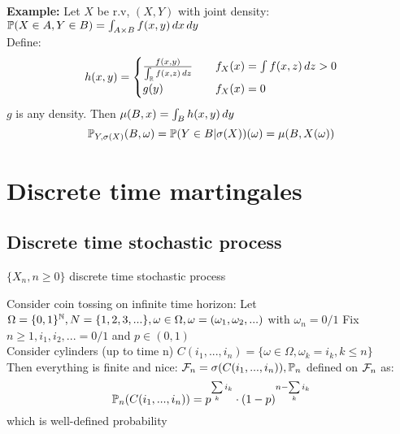 \textbf{Example:} Let $X$ be r.v, $(X,Y)$ with joint density: $\mathbb{P}(X\in A, Y\in B) =\int_{A\times B} f(x,y) \mathop{}\!d x\mathop{}\!d y$ \\Define:
\begin{equation*}
    h(x,y) = \begin{cases}
    \frac{f(x,y)}{\int_{\mathbb{R}} f(x,z) \mathop{}\!d z} \quad &f_X(x) = \int f(x,z)\mathop{}\!d z >0 \\
    g(y) \quad &f_X(x) = 0
    \end{cases}
\end{equation*}
$g$ is any density. Then $\mu(B,x)= \int_B h(x,y) \mathop{}\!d y$ 
\begin{equation*}
    \mathbb{P}_{Y,\sigma(X)} (B,\omega) = \mathbb{P}(Y\in B|\sigma(X))(\omega) = \mu(B, X(\omega))
\end{equation*}




\newpage
\section{Discrete time martingales}
\subsection*{Discrete time stochastic process}

$\{X_n, n\geq 0\}$ discrete time stochastic process
\begin{example}
Consider coin tossing on infinite time horizon: Let $\Omega = \{0,1\}^{\mathbb{N}}, N = \{1,2,3,...\}, \omega\in\Omega, \omega = (\omega_1, \omega_2, ...)$ with $\omega_n = 0/1$
Fix $n\geq 1,i_1,i_2, ... = 0/1$ and $p \in (0,1)$ \\
Consider cylinders (up to time n) $C(i_1, ..., i_n) = \{\omega\in\Omega, \omega_k = i_k, k\leq n\}$ \\
Then everything is finite and nice:
$\mathcal{F}_n = \sigma(C(i_1, ..., i_n)), \mathbb{P}_n$ defined on $\mathcal{F}_n$ as:
\begin{equation*}
    \mathbb{P}_n(C(i_1, ..., i_n)) = p^{\sum\limits_{k}i_k}\cdot (1-p)^{n-\sum\limits_{k}i_k}
\end{equation*}which is well-defined probability
\end{example}

